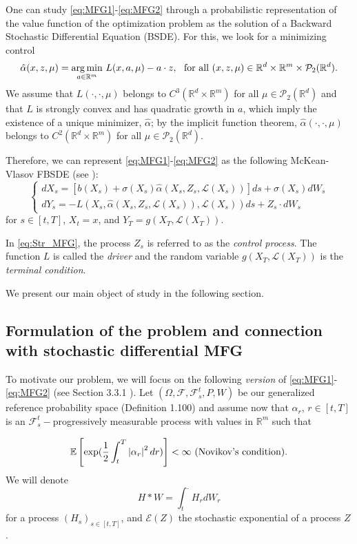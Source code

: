 \documentclass[12,english]{amsart}
\theoremstyle{plain}
\theoremstyle{definition}
\theoremstyle{plain}
\theoremstyle{plain}
\theoremstyle{remark}
\newcommand{\E}{\mathbb E}
\newcommand{\R}{\mathbb R}
\newcommand{\cE}{\mathcal E}
\newcommand{\cF}{\mathcal F}
\newcommand{\cL}{\mathcal L}
\newcommand{\cP}{\mathcal P}
\newcommand{\af}{\alpha}
\newcommand{\si}{\sigma}
\begin{document}
One can study \eqref{eq:MFG1}-\eqref{eq:MFG2} through a probabilistic representation of the value function
of the optimization problem as the solution of a Backward Stochastic
Differential Equation (BSDE). For this, we look for a minimizing control
\[
\hat\af(x,z,\mu)=\underset{a\in\R^m}{\arg\min}\ L(x,a,\mu)-a\cdot z,
~\hbox{ for all }(x,z,\mu)\in\R^d\times\R^m\times\cP_2(\R^d).
\]
We assume that $L(\cdot,\cdot,\mu)$ belongs to
$C^3(\R^d\times\R^m)$ for all $\mu\in\cP_2(\R^d)$ and that $L$ is strongly convex and
has quadratic growth in $a$, which imply the existence of a
unique minimizer, $\hat\af$; by the implicit function theorem, $\hat\af(\cdot,\cdot,\mu)$ belongs to
$C^2(\R^d\times\R^m)$  for all $\mu\in\cP_2(\R^d)$.

Therefore, we can
represent \eqref{eq:MFG1}-\eqref{eq:MFG2} as the following McKean-Vlasov FBSDE
(see \cite[Section 4.4]{carmona2018probabilistic}):
\begin{equation}
\begin{cases}
dX_s=\left[b(X_s)+\si(X_s)\hat{\alpha}(X_s,Z_s,\cL(X_s))\right]ds+\si(X_s)dW_s\\
dY_s=-L(X_s,\hat{\alpha}(X_s,Z_s,\cL(X_s)),\cL(X_s))ds+Z_s\cdot dW_s
\end{cases}\label{eq:Str_MFG}
\end{equation}
for $s\in\left[t,T\right]$, $X_t=x$, and $Y_T=g(X_T,\cL(X_T))$.

In \eqref{eq:Str_MFG}, the process $Z_s$ is referred to as
the {\em control process}. The function $L$ is called the {\em driver}
and the random variable $g(X_T,\cL(X_T))$ is the {\em terminal condition}. 

We present our main object of study in the following section.

\subsection{Formulation of the problem and connection with stochastic differential MFG}
To motivate our problem, we will focus on the following {\em version} of
\eqref{eq:MFG1}-\eqref{eq:MFG2} (see Section 3.3.1 \cite{carmona2018probabilistic}).
Let $(\Omega,\cF,\cF_s^t,P,W)$ be 
our generalized reference probability space
\cite{fabbri2017stochastic}(Definition 1.100) and assume now that $\alpha_r$, 
$r\in\left[t,T\right]$ is an $\cF_s^t-$progressively 
measurable process with values in $\R^m$ such that 

\begin{equation}
  \E\left[\exp(\frac12\int_t^T\left|\alpha_r\right|^2dr)\right]<\infty
  \hbox{ (Novikov's condition).}\label{eq:Nov}
\end{equation}
We will denote
\[H\ast W=\int_t^. H_rdW_r\]
for a process $(H_s)_{s\in[t,T]}$, 
and $\cE(Z)$ the stochastic exponential of a process $Z$.
\end{document}
